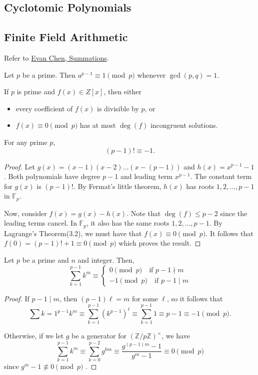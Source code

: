 \documentclass[11pt]{article}
\newcommand{\Z}{\mathbb{Z}}
\newcommand{\F}{\mathbb{F}}
\renewcommand{\>}{\rangle}
\newcommand{\<}{\langle}
\begin{document}
\subsection{Cyclotomic Polynomials}
\subsection{Finite Field Arithmetic}
Refer to \href{https://web.evanchen.cc/handouts/Summation/Summation.pdf}{Evan Chen, Summations}.
\begin{theorem} Let $p$ be a prime.  Then $a^{p-1} \equiv 1 \pmod{p}$ whenever $\gcd(p, q) = 1$.
\end{theorem}
\begin{theorem} If $p$ is prime and $f(x) \in Z[x]$, then either
\begin{itemize}
\item every coefficient of $f(x)$ is divisible by $p$, or 
\item $f(x) \equiv 0 \pmod{p}$ has at most $\deg(f)$ incongruent solutions.  
\end{itemize}
\end{theorem}
\begin{theorem} For any prime $p$,
$$(p-1)! \equiv -1.$$
\end{theorem}
\begin{proof}
Let $g(x) = (x-1)(x-2) \dots (x - (p-1))$ and $h(x) = x^{p-1} - 1$.  Both polynomials have degree $p-1$ and leading term $x^{p-1}$.  The constant term for $g(x)$ is $(p-1)!$.  By Fermat's little theorem, $h(x)$ has roots $1, 2, \dots, p-1$ in $\F_p$.

Now, consider $f(x) = g(x) - h(x)$.  Note that $\deg(f) \le p-2$ since the leading terms cancel.  In $\F_p$, it also has the same roots $1, 2, \dots, p-1$.   By Lagrange's Theorem(3.2), we must have that $f(x) \equiv 0 \pmod{p}$.  It follows that $f(0) = (p-1)! + 1 \equiv 0 \pmod{p}$ which proves the result.  
\end{proof}
\begin{theorem} Let $p$ be a prime and $n$ and integer.  Then,
$$\sum_{k=1}^{p-1} k^m \equiv \begin{cases}
0 \pmod{p} \quad \text{if } p-1 \nmid m \\
-1 \pmod{p} \quad \text{if } p-1 \mid m
\end{cases}$$
\end{theorem}
\begin{proof}
If $p-1 \mid m$, then $(p-1)\ell =m$ for some $\ell$, so it follows that 
$$\sum{k=1}^{p-1} k^m \equiv \sum_{k=1}^{p-1} (k^{p-1})^{\ell} \equiv \sum_{k=1}^{p-1} 1 \equiv p-1 \equiv -1 \pmod{p}.$$

Otherwise, if we let $g$ be a generator for $(\Z/p\Z)^\times$, we have 
$$\sum_{k=1}^{p-1} k^m \equiv \sum_{k=0}^{p-2} g^{km} \equiv \frac{g^{(p-1)m} - 1}{g^{m} - 1} \equiv 0 \pmod{p}$$
since $g^{m} -1 \not \equiv 0 \pmod{p}$ .
\end{proof}
\end{document}

